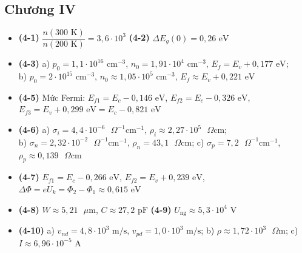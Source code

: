 \documentclass[11pt,a4paper]{article}
\begin{document}
\subsection*{Chương IV}
\begin{itemize}[itemsep=0.5pt, topsep=1pt, parsep=0pt, leftmargin=1.8em]
  \item \textbf{(4-1)} $\dfrac{n(300\text{ K})}{n(200\text{ K})} = 3{,}6 \cdot 10^3$ \quad \textbf{(4-2)} $\Delta E_g(0) = 0{,}26\text{ eV}$
  \item \textbf{(4-3)} a) $p_0 = 1{,}1 \cdot 10^{16}\text{ cm}^{-3}$, $n_0 = 1{,}91 \cdot 10^4\text{ cm}^{-3}$, $E_f = E_v + 0{,}177\text{ eV}$;\\
  b) $p_0 = 2 \cdot 10^{15}\text{ cm}^{-3}$, $n_0 \approx 1{,}05 \cdot 10^5\text{ cm}^{-3}$, $E_f \approx E_v + 0{,}221\text{ eV}$
  \item \textbf{(4-5)} Mức Fermi: $E_{f1} = E_c - 0{,}146\text{ eV}$, $E_{f2} = E_c - 0{,}326\text{ eV}$, $E_{f3} = E_v + 0{,}299\text{ eV} = E_c - 0{,}821\text{ eV}$
  \item \textbf{(4-6)} a) $\sigma_i = 4{,}4 \cdot 10^{-6}\text{ }\Omega^{-1}\text{cm}^{-1}$, $\rho_i \approx 2{,}27 \cdot 10^{5}\text{ }\Omega\text{cm}$;\\
  b) $\sigma_n = 2{,}32 \cdot 10^{-2}\text{ }\Omega^{-1}\text{cm}^{-1}$, $\rho_n = 43{,}1\text{ }\Omega\text{cm}$; \quad
  c) $\sigma_p = 7{,}2\text{ }\Omega^{-1}\text{cm}^{-1}$, $\rho_p \approx 0{,}139\text{ }\Omega\text{cm}$
  \item \textbf{(4-7)} $E_{f1} = E_c - 0{,}266\text{ eV}$, $E_{f2} = E_v + 0{,}239\text{ eV}$, $\Delta \Phi = eU_k = \Phi_2 - \Phi_1 \approx 0{,}615\text{ eV}$
  \item \textbf{(4-8)} $W \approx 5{,}21\text{ }\mu\text{m}$, $C \approx 27{,}2\text{ pF}$ \quad \textbf{(4-9)} $U_{\text{ng}} \approx 5{,}3 \cdot 10^4\text{ V}$
  \item \textbf{(4-10)} a) $v_{nd} = 4{,}8 \cdot 10^3\text{ m/s}$, $v_{pd} = 1{,}0 \cdot 10^3\text{ m/s}$; b) $\rho \approx 1{,}72 \cdot 10^3\text{ }\Omega\text{m}$; c) $I \approx 6{,}96 \cdot 10^{-5}\text{ A}$
\end{itemize}
\end{document}
